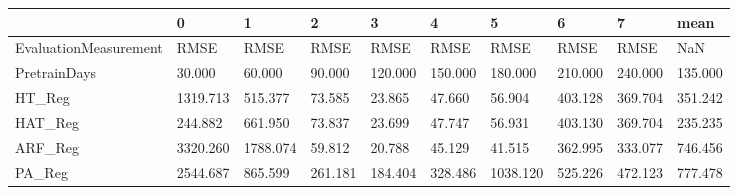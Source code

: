 \begin{tabular}{llllllllll}
\toprule
{} &        0 &        1 &       2 &       3 &       4 &        5 &       6 &       7 &    mean \\
\midrule
EvaluationMeasurement &     RMSE &     RMSE &    RMSE &    RMSE &    RMSE &     RMSE &    RMSE &    RMSE &     NaN \\
PretrainDays          &   30.000 &   60.000 &  90.000 & 120.000 & 150.000 &  180.000 & 210.000 & 240.000 & 135.000 \\
HT\_Reg                & 1319.713 &  515.377 &  73.585 &  23.865 &  47.660 &   56.904 & 403.128 & 369.704 & 351.242 \\
HAT\_Reg               &  244.882 &  661.950 &  73.837 &  23.699 &  47.747 &   56.931 & 403.130 & 369.704 & 235.235 \\
ARF\_Reg               & 3320.260 & 1788.074 &  59.812 &  20.788 &  45.129 &   41.515 & 362.995 & 333.077 & 746.456 \\
PA\_Reg                & 2544.687 &  865.599 & 261.181 & 184.404 & 328.486 & 1038.120 & 525.226 & 472.123 & 777.478 \\
\bottomrule
\end{tabular}
